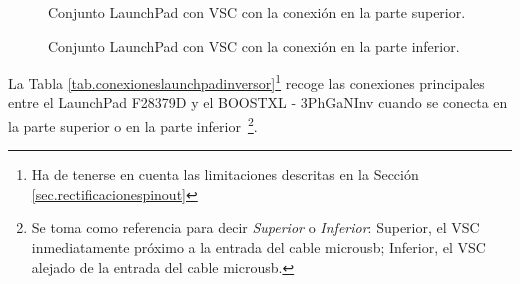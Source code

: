 \documentclass{report}
\begin{document}
\begin{figure}[!h]
    \begin{center}
        \end{center}
        \caption{Conjunto LaunchPad con VSC con la conexión en la parte superior.}
        \label{fig.conjunto_superior_1}
\end{figure}

\begin{figure}[!h]
    \begin{center}
        \end{center}
        \caption{Conjunto LaunchPad con VSC con la conexión en la parte inferior.}
        \label{fig.conjunto_superior_2}
\end{figure}


La Tabla \ref{tab.conexioneslaunchpadinversor}\footnote{Ha de tenerse en cuenta las limitaciones descritas en la Sección \ref{sec.rectificacionespinout}} recoge las conexiones principales entre el LaunchPad F28379D y el BOOSTXL - 3PhGaNInv cuando se conecta en la parte superior o en la parte inferior \footnote{Se toma como referencia para decir \textit{Superior} o \textit{Inferior}: Superior, el VSC inmediatamente próximo a la entrada del cable microusb; Inferior, el VSC alejado de la entrada del cable microusb.}.
\end{document}
